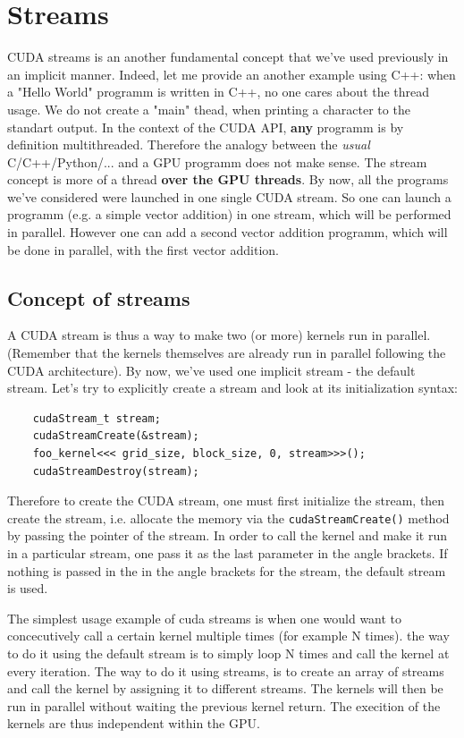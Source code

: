 \documentclass[12pt]{article}
\begin{document}
\section{Streams}
CUDA streams is an another fundamental concept that we've used previously in an implicit manner.
Indeed, let me provide an another example using C++: when a "Hello World" programm is written in C++, 
no one cares about the thread usage. We do not create a "main" thead, when printing a character to 
the standart output. In the context of the CUDA API, \textbf{any} programm is by definition multithreaded. 
Therefore the analogy between the \textit{usual} C/C++/Python/... and a GPU programm does not make sense.
The stream concept is more of a thread \textbf{over the GPU threads}. 
By now, all the programs we've considered were launched in one single CUDA stream. So one can launch a 
programm (e.g. a simple vector addition) in one stream, which will be performed in parallel. However one can 
add a second vector addition programm, which will be done in parallel, with the first vector addition.
\subsection{Concept of streams}
A CUDA stream is thus a way to make two (or more) kernels run in parallel. (Remember that the kernels 
themselves are already run in parallel following the CUDA architecture). By now, we've used one implicit stream - the default stream.
Let's try to explicitly create a stream and look at its initialization syntax:
\begin{verbatim}
    cudaStream_t stream;
    cudaStreamCreate(&stream);
    foo_kernel<<< grid_size, block_size, 0, stream>>>();
    cudaStreamDestroy(stream);
\end{verbatim}

Therefore to create the CUDA stream, one must first initialize the stream, then create the stream, i.e. 
allocate the memory via the \verb|cudaStreamCreate()| method by passing the pointer of the stream. 
In order to call the kernel and make it run in a particular stream, one pass it as the last parameter in the angle brackets.
If nothing is passed in the in the angle brackets for the stream, the default stream is used.

The simplest usage example of cuda streams is when one would want to concecutively call a certain kernel multiple times 
(for example N times). 
the way to do it using the default stream is to simply loop N times and call the kernel at every iteration.
The way to do it using streams, is to create an array of streams and call the kernel by assigning it to different streams.
The kernels will then be run in parallel without waiting the previous kernel return. The execition of the kernels 
are thus independent within the GPU. 
\end{document}
